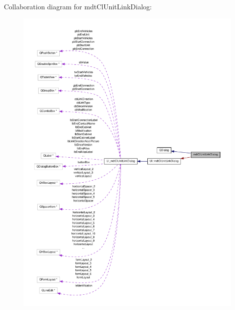 Collaboration diagram for mdt\-Cl\-Unit\-Link\-Dialog\-:
\nopagebreak
\begin{figure}[H]
\begin{center}
\leavevmode
\includegraphics[width=350pt]{classmdt_cl_unit_link_dialog__coll__graph}
\end{center}
\end{figure}
